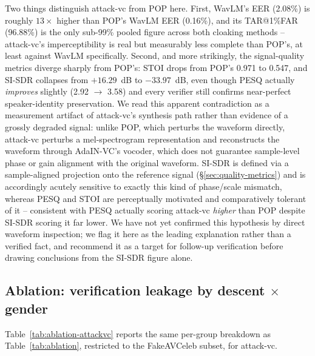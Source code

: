 \documentclass[11pt]{article}
\begin{document}
Two things distinguish attack-vc from POP here. First, WavLM's EER
(2.08\%) is roughly $13\times$ higher than POP's WavLM EER (0.16\%),
and its TAR@1\%FAR (96.88\%) is the only sub-99\% pooled figure across
both cloaking methods -- attack-vc's imperceptibility is real but
measurably less complete than POP's, at least against WavLM
specifically. Second, and more strikingly, the signal-quality metrics
diverge sharply from POP's: STOI drops from POP's 0.971 to 0.547, and
SI-SDR collapses from $+16.29$~dB to $-33.97$~dB, even though PESQ
actually \emph{improves} slightly (2.92 $\rightarrow$ 3.58) and every
verifier still confirms near-perfect speaker-identity preservation.
We read this apparent contradiction as a measurement artifact of
attack-vc's synthesis path rather than evidence of a grossly degraded
signal: unlike POP, which perturbs the waveform directly, attack-vc
perturbs a mel-spectrogram representation and reconstructs the
waveform through AdaIN-VC's vocoder, which does not guarantee
sample-level phase or gain alignment with the original waveform.
SI-SDR is defined via a sample-aligned projection onto the reference
signal (\S\ref{sec:quality-metrics}) and is accordingly acutely
sensitive to exactly this kind of phase/scale mismatch, whereas PESQ
and STOI are perceptually motivated and comparatively tolerant of
it -- consistent with PESQ actually scoring attack-vc \emph{higher}
than POP despite SI-SDR scoring it far lower. We have not yet
confirmed this hypothesis by direct waveform inspection; we flag it
here as the leading explanation rather than a verified fact, and
recommend it as a target for follow-up verification before drawing
conclusions from the SI-SDR figure alone.

\subsection{Ablation: verification leakage by descent $\times$ gender}
\label{sec:ablation-attackvc}
Table~\ref{tab:ablation-attackvc} reports the same per-group breakdown
as Table~\ref{tab:ablation}, restricted to the FakeAVCeleb subset,
for attack-vc.
\end{document}

